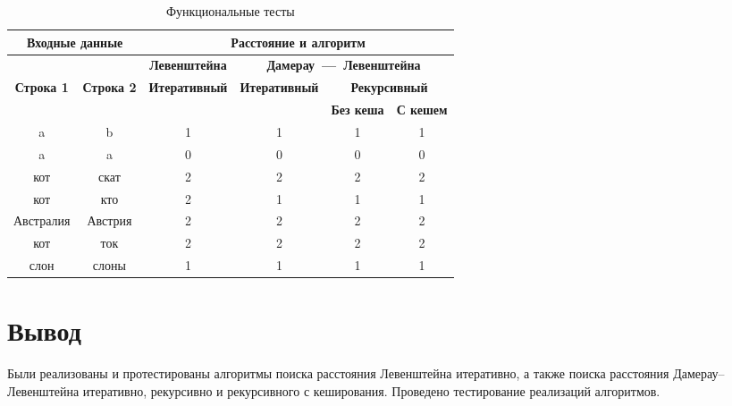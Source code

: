 \begin{table}[ht]
	\small
	\begin{center}
		\begin{threeparttable}
		\caption{Функциональные тесты}
		\label{tbl:func_tests}
		\begin{tabular}{|c|c|c|c|c|c|}
			\hline
			\multicolumn{2}{|c|}{\bfseries Входные данные}
			& \multicolumn{4}{c|}{\bfseries Расстояние и алгоритм} \\ 
			\hline 
			&
			& \multicolumn{1}{c|}{\bfseries Левенштейна} 
			& \multicolumn{3}{c|}{\bfseries Дамерау~---~Левенштейна} \\ \cline{3-6}
			
			\bfseries Строка 1 & \bfseries Строка 2 & \bfseries Итеративный & \bfseries Итеративный
			
			& \multicolumn{2}{c|}{\bfseries Рекурсивный} \\ \cline{5-6}
			& & & & \bfseries Без кеша & \bfseries С кешем \\
			\hline
			a & b & 1 & 1 & 1 & 1 \\
			\hline
			a & a & 0 & 0 & 0 & 0 \\
			\hline
			кот & скат & 2 & 2 & 2 & 2 \\
			\hline
			кот & кто & 2 & 1 & 1 & 1 \\
			\hline
			Австралия & Австрия & 2 & 2 & 2 & 2 \\
			\hline
			кот & ток & 2 & 2 & 2 & 2 \\
			\hline
			слон & слоны & 1 & 1 & 1 & 1 \\
			\hline
		\end{tabular}	
		\end{threeparttable}
	\end{center}
\end{table}

\section*{Вывод}
Были реализованы и протестированы алгоритмы поиска расстояния Левенштейна итеративно, а также поиска расстояния Дамерау–Левенштейна итеративно, рекурсивно и рекурсивного с кеширования. Проведено тестирование реализаций алгоритмов.
